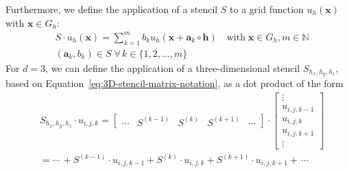Furthermore, we define the application of a stencil $S$ to a grid function $u_h(\bm x)$ with $\bm x \in G_h$:
\begin{equation}
	\begin{split}
		& S \cdot u_h(\bm{x}) = \sum_{k=1}^m b_k u_h({\bm x + \bm{a}_k} \circ \bm{h}) \quad 
		\text{with} \; \bm{x} \in G_h, m \in \mathbb{N} \\ & (\bm{a}_k, b_k) \in S \; \forall \, k \in \{ 1, 2, \dots, m \}
	\end{split}
\label{eq:stencil-application}
\end{equation}
For $d = 3$, we can define the application of a three-dimensional stencil $S_{h_x, h_y, h_z}$, based on Equation~\eqref{eq:3D-stencil-matrix-notation}, as a dot product of the form
\begin{equation}
	\begin{split}
	& S_{h_x, h_y, h_z} \cdot u_{i,j,k} = 	
	\begin{bmatrix}
	\cdots & S^{(k-1)} & S^{(k)} & S^{(k+1)} & \cdots 
	\end{bmatrix} \cdot
	\begin{bmatrix}
	\vdots \\ u_{i,j,k-1} \\ u_{i,j,k} \\ u_{i,j,k+1} \\ \vdots 
	\end{bmatrix} \\
	& = \cdots \, + S^{(k-1)} \cdot u_{i,j,k-1} + S^{(k)} \cdot u_{i,j,k} + S^{(k+1)} \cdot u_{i,j,k+1} + \, \cdots
	\end{split}
\end{equation}

